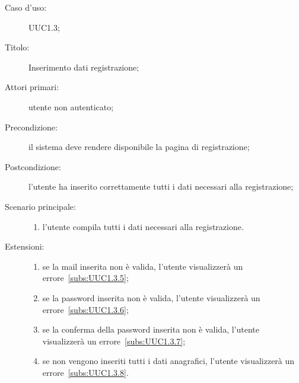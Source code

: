 \documentclass[../../../analisi-dei-requisiti.tex]{subfiles}
\begin{document}
\begin{description}
  \item[Caso d’uso:] UUC1.3;
  \item[Titolo:] Inserimento dati registrazione;
  \item[Attori primari:] utente non autenticato;
  \item[Precondizione:] il sistema deve rendere disponibile la pagina di registrazione;
  \item[Postcondizione:] l'utente ha inserito correttamente tutti i dati necessari alla registrazione;
  \item[Scenario principale:]
        \begin{enumerate}
          \item l'utente compila tutti i dati necessari alla registrazione.
        \end{enumerate}
  \item[Estensioni:]
        \begin{enumerate}
          \item se la mail inserita non è valida, l'utente visualizzerà un errore~\ref{subs:UUC1.3.5};
          \item se la password inserita non è valida, l'utente visualizzerà un errore~\ref{subs:UUC1.3.6};
          \item se la conferma della password inserita non è valida, l'utente visualizzerà un errore~\ref{subs:UUC1.3.7};
          \item se non vengono inseriti tutti i dati anagrafici, l'utente visualizzerà un errore~\ref{subs:UUC1.3.8}.
        \end{enumerate}
\end{description}
\end{document}
